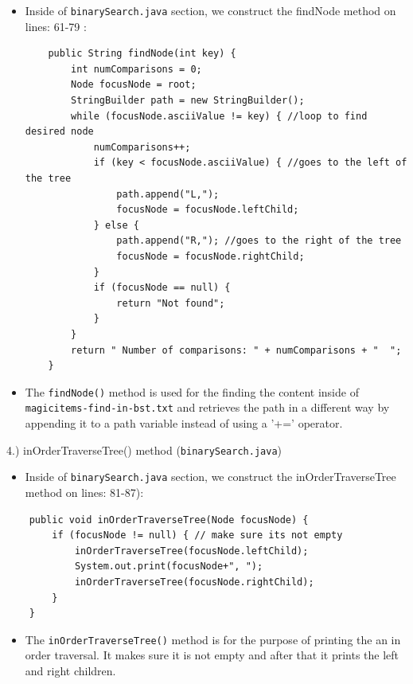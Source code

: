 \documentclass{article}
\begin{document}
\begin{itemize}
\item Inside of \verb|binarySearch.java| section, we construct the findNode method on lines: 61-79 :

\begin{verbatim}
    public String findNode(int key) {
        int numComparisons = 0;
        Node focusNode = root;
        StringBuilder path = new StringBuilder();
        while (focusNode.asciiValue != key) { //loop to find desired node
            numComparisons++;
            if (key < focusNode.asciiValue) { //goes to the left of the tree
                path.append("L,"); 
                focusNode = focusNode.leftChild;
            } else {
                path.append("R,"); //goes to the right of the tree
                focusNode = focusNode.rightChild;
            }
            if (focusNode == null) {
                return "Not found";
            }
        }
        return " Number of comparisons: " + numComparisons + "  ";
    }
\end{verbatim}
\item The \verb|findNode()| method is used for the finding the content inside of \verb|magicitems-find-in-bst.txt| and retrieves the path in a different way by appending it to a path variable instead of using a '+=' operator.\\

\end{itemize}


\begin{large}
    4.) inOrderTraverseTree() method (\verb|binarySearch.java|)
\end{large}

\begin{itemize}
\item Inside of \verb|binarySearch.java| section, we construct the inOrderTraverseTree method on lines: 81-87):
\end{itemize}

\begin{verbatim}
    public void inOrderTraverseTree(Node focusNode) {
        if (focusNode != null) { // make sure its not empty
            inOrderTraverseTree(focusNode.leftChild);
            System.out.print(focusNode+", ");
            inOrderTraverseTree(focusNode.rightChild);
        }
    }
\end{verbatim}

\begin{itemize}

\item The \verb|inOrderTraverseTree()| method is for the purpose of printing the an in order traversal. It makes sure it is not empty and after that it prints the left and right children.\\

\end{itemize}
\end{document}

